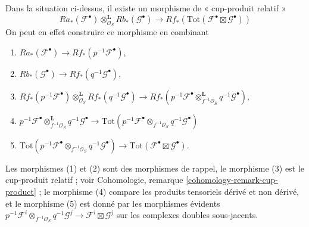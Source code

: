 \medskip\noindent
Dans la situation ci-dessus, il existe un morphisme de « cup-produit relatif »
\begin{equation}
\label{equation-relative-de-rham-kunneth}
Ra_*(\mathcal{F}^\bullet)
\otimes_{\mathcal{O}_S}^\mathbf{L}
Rb_*(\mathcal{G}^\bullet)
\longrightarrow
Rf_*\left(\text{Tot}(\mathcal{F}^\bullet \boxtimes \mathcal{G}^\bullet)\right)
\end{equation}
On peut en effet construire ce morphisme en combinant
\begin{enumerate}
\item $Ra_*(\mathcal{F}^\bullet) \to Rf_*(p^{-1}\mathcal{F}^\bullet)$,
\item $Rb_*(\mathcal{G}^\bullet) \to Rf_*(q^{-1}\mathcal{G}^\bullet)$,
\item
$Rf_*(p^{-1}\mathcal{F}^\bullet)
\otimes_{\mathcal{O}_S}^\mathbf{L}
Rf_*(q^{-1}\mathcal{G}^\bullet)
\to
Rf_*(p^{-1}\mathcal{F}^\bullet \otimes_{f^{-1}\mathcal{O}_S}^\mathbf{L}
q^{-1}\mathcal{G}^\bullet)$,
\item
$p^{-1}\mathcal{F}^\bullet \otimes_{f^{-1}\mathcal{O}_S}^\mathbf{L}
q^{-1}\mathcal{G}^\bullet \to
\text{Tot}(p^{-1}\mathcal{F}^\bullet \otimes_{f^{-1}\mathcal{O}_S}
q^{-1}\mathcal{G}^\bullet)$
\item
$\text{Tot}(p^{-1}\mathcal{F}^\bullet \otimes_{f^{-1}\mathcal{O}_S}
q^{-1}\mathcal{G}^\bullet) \to \text{Tot}(\mathcal{F}^\bullet \boxtimes
\mathcal{G}^\bullet)$.
\end{enumerate}
Les morphismes (1) et (2) sont des morphismes de rappel, le morphisme (3) est
le cup-produit relatif ; voir
Cohomologie, remarque \ref{cohomology-remark-cup-product} ;
le morphisme (4) compare les produits tensoriels dérivé et non dérivé, et
le morphisme (5) est donné par les morphismes évidents
$p^{-1}\mathcal{F}^i \otimes_{f^{-1}\mathcal{O}_S} q^{-1}\mathcal{G}^j
\to \mathcal{F}^i \boxtimes \mathcal{G}^j$ sur les complexes doubles sous-jacents.

